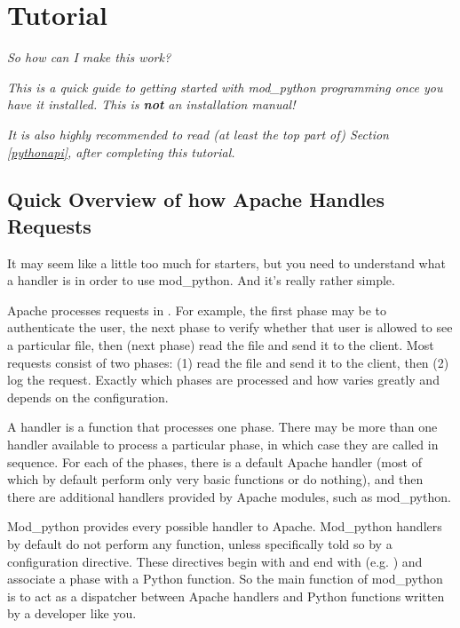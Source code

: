 \chapter{Tutorial\label{tutorial}}

\begin{flushright}
\emph{So how can I make this work?}
\end{flushright}

\emph{This is a quick guide to getting started with mod_python 
programming once you have it installed. This is \textbf{not} an
installation manual!}

\emph{It is also highly recommended to read (at least the top part of)
Section \ref{pythonapi},  after
completing this tutorial.}

\section{Quick Overview of how Apache Handles Requests\label{tut-overview}}

It may seem like a little too much for starters, but you need to
understand what a handler is in order to use mod_python. And it's
really rather simple.

Apache processes requests in . For example, the first phase may
be to authenticate the user, the next phase to verify whether that
user is allowed to see a particular file, then (next phase) read the
file and send it to the client. Most requests consist of two phases:
(1) read the file and send it to the client, then (2) log the
request. Exactly which phases are processed and how varies greatly and
depends on the configuration.

A handler is a function that processes one phase. There may be more
than one handler available to process a particular phase, in which
case they are called in sequence. For each of the phases, there is a
default Apache handler (most of which by default perform only very
basic functions or do nothing), and then there are additional handlers
provided by Apache modules, such as mod_python.

Mod_python provides every possible handler to Apache. Mod_python
handlers by default do not perform any function, unless specifically
told so by a configuration directive. These directives begin with
 and end with 
(e.g. ) and associate a phase with a Python
function. So the main function of mod_python is to act as a dispatcher
between Apache handlers and Python functions written by a developer
like you.

